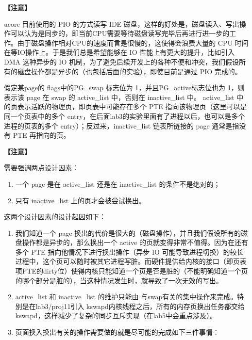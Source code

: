 \textbf{【注意】}

ucore 目前使用的 PIO 的方式读写 IDE
磁盘，这样的好处是，磁盘读入、写出操作可以认为是同步的，即当前CPU需要等待磁盘读写完毕后再进行进一步的工作。由于磁盘操作相对CPU的速度而言是很慢的，这使得会浪费大量的
CPU 时间在等IO操作上。于是我们总是希望能够在 IO
性能上有更大的提升，比如引入 DMA 这种异步的 IO
机制，为了避免后续开发上的各种不便和冲突，我们假设所有的磁盘操作都是异步的（也包括后面的实验），即使目前是通过
PIO 完成的。

假定某page的 flags中的PG\_swap 标志位为 1，并且PG\_active标志位也为
1，则表示该 page 在 swap 的 active\_list 中，否则在 inactive\_list 中。
active\_list 中的页表示活跃的物理页，即页表中可能存在多个 PTE
指向该物理页（这里可以是同一个页表中的多个
entry，在后面lab3的实验里面有了进程以后，也可以是多个进程的页表的多个
entry）；反过来，inactive\_list 链表所链接的 page 通常是指没有 PTE
再指向的页。

\textbf{【注意】}

需要强调两点设计因素：

\begin{enumerate}
\def\labelenumi{\arabic{enumi}.}
\item
  一个 page 是在 active\_list 还是在 inactive\_list 的条件不是绝对的；
\item
  只有 inactive\_list 上的页才会被尝试换出。
\end{enumerate}

这两个设计因素的设计起因如下：

\begin{enumerate}
\def\labelenumi{\arabic{enumi}.}
\item
  我们知道一个 page
  换出的代价是很大的（磁盘操作），并且我们假设所有的磁盘操作都是异步的，那么换出一个
  active 的页就变得非常不值得。因为在还有多个 PTE
  指向他情况下进行换出操作（异步 IO
  可能导致进程切换）的较长过程中，这个页可以随时被其它进程写脏。而硬件提供给内核的接口（即页表项PTE的dirty位）使得内核只能知道一个页是否是脏的（不能明确知道一个页的哪个部分是脏的），当这种情况发生时，就导致了一次无效的写出。
\item
  active\_list 和 inactive\_list 的维护只能由
  与swap有关的集中操作来完成。特别是在lab3/proj11引入
  kswapd内核线程之后，所有的内存页换出任务都交给kswapd，这样减少了复杂的同步互斥实现（在lab5中会重点涉及）。
\item
  页面换入换出有关的操作需要做的就是尽可能的完成如下三件事情：
\end{enumerate}


